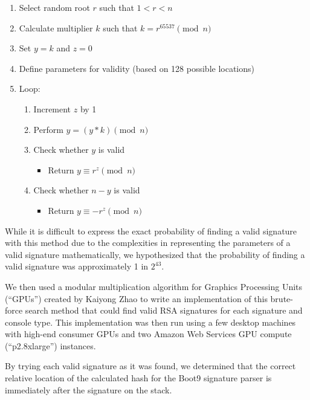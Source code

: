 \documentclass[journal]{IEEEtran}
\begin{document}
\medskip
\begin{enumerate}
  \item Select random root \(r\) such that \(1 < r < n\)
  \item Calculate multiplier \(k\) such that \(k = r^{65537} \pmod{n}\)
  \item Set \(y = k\) and \(z = 0\)
  \item Define parameters for validity (based on 128 possible locations)
  \item Loop:
    \begin{enumerate}
      \item Increment \(z\) by 1
      \item Perform \(y = (y * k) \pmod{n}\)
      \item Check whether \(y\) is valid
        \begin{itemize}
          \item Return \(y \equiv r^{z} \pmod{n}\)
        \end{itemize}
      \item Check whether \(n - y\) is valid
        \begin{itemize}
          \item Return \(y \equiv -r^{z} \pmod{n}\)
        \end{itemize}
    \end{enumerate}
\end{enumerate}
\medskip

While it is difficult to express the exact probability of finding a valid
signature with this method due to the complexities in representing the
parameters of a valid signature mathematically, we hypothesized that the
probability of finding a valid signature was approximately 1 in \(2^{43}\).

We then used a modular multiplication algorithm for Graphics Processing Units
(``GPUs'') created by Kaiyong Zhao\cite{modmult} to write an implementation of
this brute-force search method that could find valid RSA signatures for each
signature and console type\cite{sighaxgpu}. This implementation was then run
using a few desktop machines with high-end consumer GPUs and two Amazon Web
Services GPU compute (``p2.8xlarge'') instances.

By trying each valid signature as it was found, we determined that the correct
relative location of the calculated hash for the Boot9 signature parser is
immediately after the signature on the stack.
\end{document}
